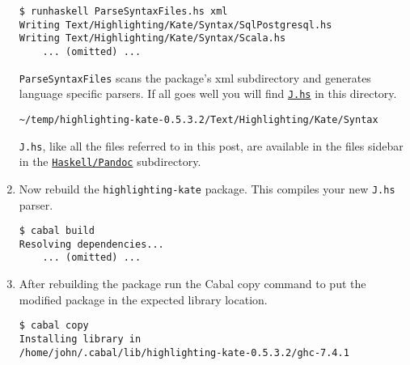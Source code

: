 \begin{enumerate}
\begin{tcolorbox}[breakable, size=fbox, boxrule=1pt, pad at break*=1mm,colback=cellbackground, colframe=cellborder]
\begin{verbatim}
$ runhaskell ParseSyntaxFiles.hs xml
Writing Text/Highlighting/Kate/Syntax/SqlPostgresql.hs
Writing Text/Highlighting/Kate/Syntax/Scala.hs
    ... (omitted) ...
\end{verbatim}
\end{tcolorbox}

  \texttt{ParseSyntaxFiles} scans the package's xml subdirectory and
  generates language specific parsers. If all goes well you will find
  \href{https://www.box.com/s/20x4mes7neyj05lppued}{\texttt{J.hs}} in this directory.

\begin{tcolorbox}[breakable, size=fbox, boxrule=1pt, pad at break*=1mm,colback=cellbackground, colframe=cellborder]
\begin{verbatim}
~/temp/highlighting-kate-0.5.3.2/Text/Highlighting/Kate/Syntax
\end{verbatim}
\end{tcolorbox}

  \texttt{J.hs}, like all the files referred to in this post, are
  available in the files sidebar in the \href{https://www.box.com/s/vqg6chj0hpysjnxhulz5}{\texttt{Haskell/Pandoc}}
  subdirectory.
\item
  Now rebuild the \texttt{highlighting-kate} package. This compiles your
  new \texttt{J.hs} parser.

\begin{tcolorbox}[breakable, size=fbox, boxrule=1pt, pad at break*=1mm,colback=cellbackground, colframe=cellborder]
\begin{verbatim}
$ cabal build
Resolving dependencies...
    ... (omitted) ...
\end{verbatim}
\end{tcolorbox}
\item
  After rebuilding the package run the Cabal copy command to put the
  modified package in the expected library location.

\begin{tcolorbox}[breakable, size=fbox, boxrule=1pt, pad at break*=1mm,colback=cellbackground, colframe=cellborder]
\begin{verbatim}
$ cabal copy
Installing library in
/home/john/.cabal/lib/highlighting-kate-0.5.3.2/ghc-7.4.1
\end{verbatim}
\end{tcolorbox}
\end{enumerate}

